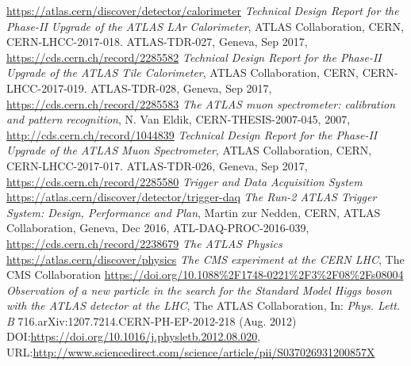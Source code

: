 \documentclass[a4paper, oneside, 11pt, openright]{book}
\begin{document}
\begin{thebibliography}{32}
			\url{https://atlas.cern/discover/detector/calorimeter}
			\textit{Technical Design Report for the Phase-II Upgrade of the ATLAS LAr Calorimeter}, ATLAS Collaboration, CERN, CERN-LHCC-2017-018. ATLAS-TDR-027, Geneva, Sep 2017, \url{https://cds.cern.ch/record/2285582}
			\textit{Technical Design Report for the Phase-II Upgrade of the ATLAS Tile Calorimeter}, ATLAS Collaboration, CERN, CERN-LHCC-2017-019. ATLAS-TDR-028, Geneva, Sep 2017, \url{https://cds.cern.ch/record/2285583}	
			\textit{The ATLAS muon spectrometer: calibration and pattern recognition}, N. Van Eldik, CERN-THESIS-2007-045, 2007,
			\url{http://cds.cern.ch/record/1044839}
			\textit{Technical Design Report for the Phase-II Upgrade of the ATLAS Muon Spectrometer}, ATLAS Collaboration, CERN, CERN-LHCC-2017-017. ATLAS-TDR-026, Geneva, Sep 2017, \url{https://cds.cern.ch/record/2285580}
			\textit{Trigger and Data Acquisition System}
			\url{https://atlas.cern/discover/detector/trigger-daq}	
			\textit{The Run-2 ATLAS Trigger System: Design, Performance and
			Plan}, Martin zur Nedden, CERN, ATLAS Collaboration, Geneva, Dec 2016, ATL-DAQ-PROC-2016-039,
			\url{https://cds.cern.ch/record/2238679}
			\textit{The ATLAS Physics}
			\url{https://atlas.cern/discover/physics}
			\textit{The CMS experiment at the CERN LHC}, The CMS Collaboration
			\url{https://doi.org/10.1088%2F1748-0221%2F3%2F08%2Fs08004}
			\textit{Observation of a new particle in the search for the Standard Model Higgs boson with the ATLAS detector at the LHC},
			The ATLAS Collaboration, In: \textit{Phys. Lett. B} 716.arXiv:1207.7214.CERN-PH-EP-2012-218 (Aug. 2012) DOI:\url{https://doi.org/10.1016/j.physletb.2012.08.020}, URL:\url{http://www.sciencedirect.com/science/article/pii/S037026931200857X}
		 	

\end{thebibliography}
\end{document}
